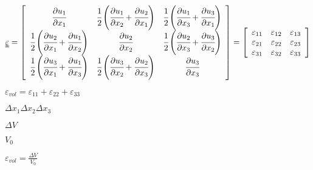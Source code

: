 \documentclass[onecolumn,11pt]{report}
\def\lthtmlcheckvsize{\ifdim\ht\sizebox<\vsize 
  \ifdim\wd\sizebox<\hsize\expandafter\hfill\fi \expandafter\vfill
  \else\expandafter\vss\fi}%
\begin{document}
{\newpage\clearpage
{}%
\begin{displaymath}\uuline{\varepsilon} =
\left[
\begin{array}{ccc}
\cfrac{\partial u_1}{\partial x_1} & \cfrac{1}{2} \left( \cfrac{\partial u_1}{\partial x_2} + \cfrac{\partial u_2}{\partial x_1} \right) &  \cfrac{1}{2} \left( \cfrac{\partial u_1}{\partial x_3} + \cfrac{\partial u_3}{\partial x_1} \right)\\
\cfrac{1}{2} \left( \cfrac{\partial u_2}{\partial x_1} + \cfrac{\partial u_1}{\partial x_2} \right) & \cfrac{\partial u_2}{\partial x_2} & \cfrac{1}{2} \left( \cfrac{\partial u_2}{\partial x_3} + \cfrac{\partial u_3}{\partial x_2} \right)\\
\cfrac{1}{2} \left( \cfrac{\partial u_3}{\partial x_1} + \cfrac{\partial u_1}{\partial x_3} \right) &  \cfrac{1}{2} \left( \cfrac{\partial u_3}{\partial x_2} + \cfrac{\partial u_2}{\partial x_3} \right) & \cfrac{\partial u_3}{\partial x_3}
\end{array}
\right] =
\left[
\begin{array}{ccc}
\varepsilon_{11} & \varepsilon_{12}  &  \varepsilon_{13} \\
\varepsilon_{21} & \varepsilon_{22}  &  \varepsilon_{23} \\
\varepsilon_{31} & \varepsilon_{32}  &  \varepsilon_{33}
\end{array}
\right]\end{displaymath}%
\lthtmldisplayZ
\lthtmlcheckvsize\clearpage}

{\newpage\clearpage
{}%
$\displaystyle \varepsilon_{vol} = \varepsilon_{11} + \varepsilon_{22} + \varepsilon_{33}$%
\lthtmlindisplaymathZ
\lthtmlcheckvsize\clearpage}

{\newpage\clearpage
{}%
$ \Delta x_1 \Delta x_2 \Delta x_3$%
\lthtmlindisplaymathZ
\lthtmlcheckvsize\clearpage}

{\newpage\clearpage
{}%
$ \Delta V$%
\lthtmlindisplaymathZ
\lthtmlcheckvsize\clearpage}

{\newpage\clearpage
{}%
$ V_0$%
\lthtmlindisplaymathZ
\lthtmlcheckvsize\clearpage}

{\newpage\clearpage
{}%
$\displaystyle \varepsilon_{vol} =  \frac{\Delta V}{V_0}
$%
\lthtmlindisplaymathZ
\lthtmlcheckvsize\clearpage}
\end{document}

